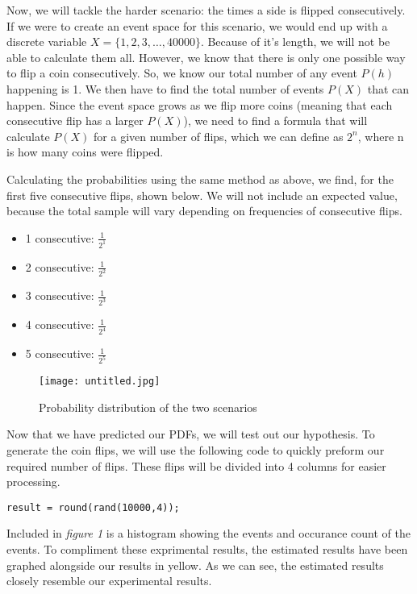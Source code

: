 \documentclass{report}
\begin{document}
Now, we will tackle the harder scenario: the times a side is flipped consecutively. If we were to create an event space for this scenario, we would end up with a discrete variable $X = \{1, 2, 3, \dots, 40000\}$. Because of it's length, we will not be able to calculate them all. However, we know that there is only one possible way to flip a coin consecutively. So, we know our total number of any event $P(h)$ happening is 1. We then have to find the total number of events $P(X)$ that can happen. Since the event space grows as we flip more coins (meaning that each consecutive flip has a larger $P(X)$), we need to find a formula that will calculate $P(X)$ for a given number of flips, which we can define as $2^n$, where n is how many coins were flipped.

Calculating the probabilities using the same method as above, we find, for the first five consecutive flips, shown below. We will not include an expected value, because the total sample will vary depending on frequencies of consecutive flips.

\begin{itemize}
\item{1 consecutive: $\frac{1}{2^1}$}
\item{2 consecutive: $\frac{1}{2^2}$}
\item{3 consecutive: $\frac{1}{2^3}$}
\item{4 consecutive: $\frac{1}{2^4}$}
\item{5 consecutive: $\frac{1}{2^5}$}
\end{itemize}


\newpage
\begin{figure}
    \centering
    \texttt{[image: untitled.jpg]}
    \caption{Probability distribution of the two scenarios}
\end{figure} 

Now that we have predicted our PDFs, we will test out our hypothesis. To generate the coin flips, we will use the following code to quickly preform our required number of flips. These flips will be divided into 4 columns for easier processing.

\begin{lstlisting}
result = round(rand(10000,4));
\end{lstlisting}

Included in \textit{figure 1} is a histogram showing the events and occurance count of the events. To compliment these exprimental results, the estimated results have been graphed alongside our results in yellow. As we can see, the estimated results closely resemble our experimental results.
\end{document}
